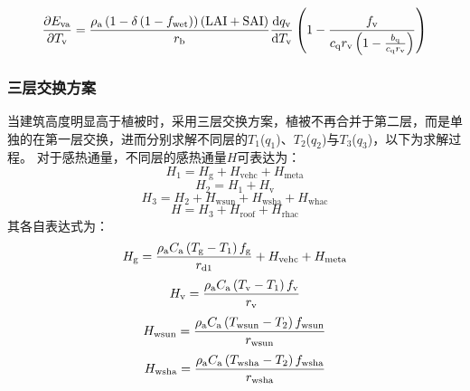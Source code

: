 %
\begin{equation}
  \frac{\partial  E_{\mathrm{va}}}{\partial T_{\mathrm{v}}} = \frac{\rho _{\rm a} \left(1-\delta\left(1-f_{\mathrm{wet}}\right)\right)\left({\rm LAI}+{\rm SAI}\right)}{r_{\mathrm{b}}} \frac{{\mathrm {d}} q_{\mathrm{v}}}{{\mathrm {d}} T_{\mathrm{v}}} \left(1-\frac{f_{\mathrm{v}}}{c_{\mathrm{q}} r_{\mathrm{v}}\left(1-\frac{b_{\mathrm{q}}}{c_{\mathrm{q}} r_{\mathrm{v}}}\right)}\right)
\end{equation}
%
%
%
\subsubsection{三层交换方案}
当建筑高度明显高于植被时，采用三层交换方案，植被不再合并于第二层，而是单独的在第一层交换，进而分别求解不同层的$T_{\mathrm{1}}$($q_{\mathrm{1}}$)、$T_{2}$($q_{2}$)与$T_{3}$($q_{3}$)，以下为求解过程。
对于感热通量，不同层的感热通量$H$可表达为：
%
\begin{equation}
  \label{3lay_H1}
  H_{1} = H_{\mathrm{g}}+H_{\mathrm{vehc}}+H_{\mathrm{meta}}
\end{equation}
%
\begin{equation}
  H_{2} = H_{1}+H_{\mathrm{v}}
\end{equation}
%
\begin{equation}
  H_{3} = H_{2}+H_{\mathrm{wsun}}+H_{\mathrm{wsha}}+H_{\mathrm{whac}}
\end{equation}
%
\begin{equation}
  \label{3lay_H3}
  H = H_{3}+H_{\mathrm{roof}}+H_{\mathrm{rhac}}
\end{equation}
其各自表达式为：
\begin{equation}\label{urban_Hg_3}
  H_{\mathrm{g}} = \frac{\rho _{\rm a} C_{\mathrm a} \left( T_{\mathrm{g}} - T_{1} \right) f_{\mathrm{g}}}{r_{\mathrm{d1}}} + H_{\mathrm{vehc}} + H_{\mathrm{meta}}
\end{equation}
%
\begin{equation}
  H_{\mathrm{v}} = \frac{\rho _{\rm a} C_{\mathrm a} \left( T_{\mathrm{v}} - T_{1} \right) f_{\rm v}}{r_{\mathrm{v}}}
\end{equation}
%
\begin{equation}
  H_{\mathrm{wsun}} = \frac{\rho  _{\rm a} C_{\mathrm a} \left( T_{\mathrm{wsun}} - T_{2} \right) f_{\mathrm{wsun}}}{r_{\mathrm{wsun}}}
\end{equation}
%
\begin{equation}
  H_{\mathrm{wsha}} = \frac{\rho _{\rm a} C_{\mathrm a} \left( T_{\mathrm{wsha}} - T_{2} \right) f_{\mathrm{wsha}}}{r_{\mathrm{wsha}}}
\end{equation}
